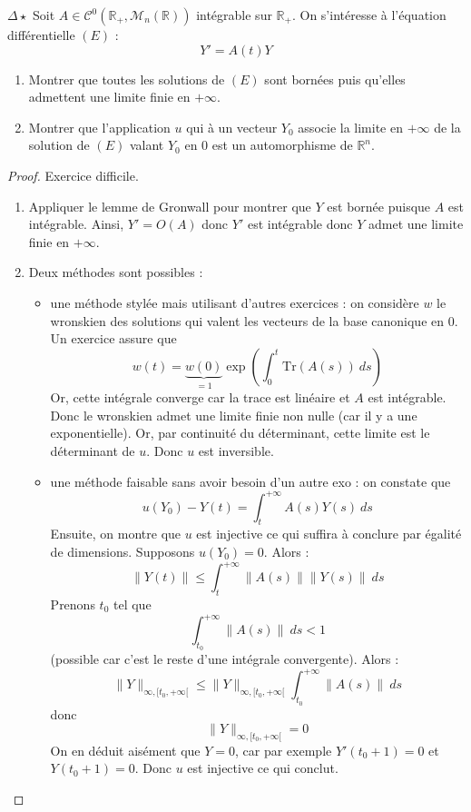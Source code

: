 \documentclass[french,a4paper]{article}
\newcommand{\R}{\mathbb{R}}
\newcommand{\Tr}{\text{Tr}}
\theoremstyle{plain}
\theoremstyle{definition}
\theoremstyle{remark}
\begin{document}
\begin{ex}[Moulin.ED.32]{$\Delta\star$}
	Soit $A\in\mathcal{C}^0(\R_+,\mathcal{M}_n(\R))$ intégrable sur $\R_+$. On s'intéresse à l'équation différentielle $(E)$ : $$Y'=A(t)Y$$
	\begin{enumerate}
		\item Montrer que toutes les solutions de $(E)$ sont bornées puis qu'elles admettent une limite finie en $+\infty$.
		\item Montrer que l'application $u$ qui à un vecteur $Y_0$ associe la limite en $+\infty$ de la solution de $(E)$ valant $Y_0$ en $0$ est un automorphisme de $\R^n$.
	\end{enumerate}
\end{ex}
\begin{proof}
	Exercice difficile.
	\begin{enumerate}
		\item Appliquer le lemme de Gronwall pour montrer que $Y$ est bornée puisque $A$ est intégrable. Ainsi, $Y'=O(A)$ donc $Y'$ est intégrable donc $Y$ admet une limite finie en $+\infty$.
		\item Deux méthodes sont possibles :
		\begin{itemize}
			\item une méthode stylée mais utilisant d'autres exercices : on considère $w$ le wronskien des solutions qui valent les vecteurs de la base canonique en $0$. Un exercice assure que $$w(t)=\underbrace{w(0)}_{=1}\exp\left(\int_{0}^{t}\Tr(A(s))\ ds\right)$$ Or, cette intégrale converge car la trace est linéaire et $A$ est intégrable. Donc le wronskien admet une limite finie non nulle (car il y a une exponentielle). Or, par continuité du déterminant, cette limite est le déterminant de $u$. Donc $u$ est inversible.
			\item une méthode faisable sans avoir besoin d'un autre exo : on constate que $$u(Y_0)-Y(t)=\int_{t}^{+\infty}A(s)Y(s)\ ds$$ Ensuite, on montre que $u$ est injective ce qui suffira à conclure par égalité de dimensions. Supposons $u(Y_0)=0$. Alors : $$\lVert Y(t)\rVert\leqslant \int_{t}^{+\infty}\lVert A(s)\rVert\lVert Y(s)\rVert\ ds$$ Prenons $t_0$ tel que $$\int_{t_0}^{+\infty}\lVert A(s)\rVert\ ds <1$$ (possible car c'est le reste d'une intégrale convergente). Alors : $$\lVert Y\rVert_{\infty,[t_0,+\infty[}\leqslant\lVert Y\rVert_{\infty,[t_0,+\infty[}\int_{t_0}^{+\infty}\lVert A(s)\rVert\ ds$$ donc $$\lVert Y\rVert_{\infty,[t_0,+\infty[}=0$$ On en déduit aisément que $Y=0$, car par exemple $Y'(t_0+1)=0$ et $Y(t_0+1)=0$. Donc $u$ est injective ce qui conclut.
		\end{itemize}
	\end{enumerate}
\end{proof}
\end{document}
